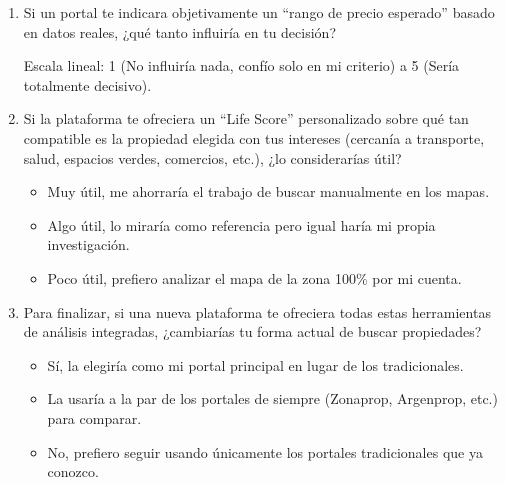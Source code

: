 \begin{enumerate}[label=\textbf{Q\arabic*:}, leftmargin=*, start=15]
\item Si un portal te indicara objetivamente un ``rango de precio esperado'' basado en datos reales, ¿qué tanto influiría en tu decisión?

Escala lineal: 1 (No influiría nada, confío solo en mi criterio) a 5 (Sería totalmente decisivo).

\item Si la plataforma te ofreciera un ``Life Score'' personalizado sobre qué tan compatible es la propiedad elegida con tus intereses (cercanía a transporte, salud, espacios verdes, comercios, etc.), ¿lo considerarías útil?

\begin{itemize}
\item Muy útil, me ahorraría el trabajo de buscar manualmente en los mapas.
\item Algo útil, lo miraría como referencia pero igual haría mi propia investigación.
\item Poco útil, prefiero analizar el mapa de la zona 100\% por mi cuenta.
\end{itemize}

\item Para finalizar, si una nueva plataforma te ofreciera todas estas herramientas de análisis integradas, ¿cambiarías tu forma actual de buscar propiedades?

\begin{itemize}
\item Sí, la elegiría como mi portal principal en lugar de los tradicionales.
\item La usaría a la par de los portales de siempre (Zonaprop, Argenprop, etc.) para comparar.
\item No, prefiero seguir usando únicamente los portales tradicionales que ya conozco.
\end{itemize}
\end{enumerate}
